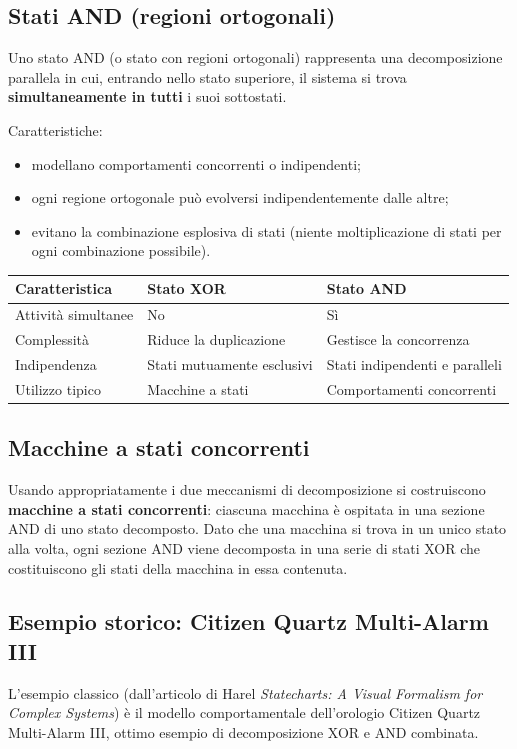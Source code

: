 \subsection{Stati AND (regioni ortogonali)}
\begin{defn}
Uno stato AND (o stato con regioni ortogonali) rappresenta una decomposizione parallela in cui, entrando nello stato superiore, il sistema si trova \textbf{simultaneamente in tutti} i suoi sottostati.
\end{defn}
Caratteristiche:
\begin{itemize}
    \item modellano comportamenti concorrenti o indipendenti;
    \item ogni regione ortogonale può evolversi indipendentemente dalle altre;
    \item evitano la combinazione esplosiva di stati (niente moltiplicazione di stati per ogni combinazione possibile).
\end{itemize}

\begin{note}
\begin{tabular}{lll}
\textbf{Caratteristica} & \textbf{Stato XOR} & \textbf{Stato AND}\\
\hline
Attività simultanee & No & Sì\\
Complessità & Riduce la duplicazione & Gestisce la concorrenza\\
Indipendenza & Stati mutuamente esclusivi & Stati indipendenti e paralleli\\
Utilizzo tipico & Macchine a stati & Comportamenti concorrenti\\
\end{tabular}
\end{note}

\subsection{Macchine a stati concorrenti}
Usando appropriatamente i due meccanismi di decomposizione si costruiscono \textbf{macchine a stati concorrenti}: ciascuna macchina è ospitata in una sezione AND di uno stato decomposto. Dato che una macchina si trova in un unico stato alla volta, ogni sezione AND viene decomposta in una serie di stati XOR che costituiscono gli stati della macchina in essa contenuta.

\subsection{Esempio storico: Citizen Quartz Multi-Alarm III}
L'esempio classico (dall'articolo di Harel \emph{Statecharts: A Visual Formalism for Complex Systems}) è il modello comportamentale dell'orologio Citizen Quartz Multi-Alarm III, ottimo esempio di decomposizione XOR e AND combinata.


